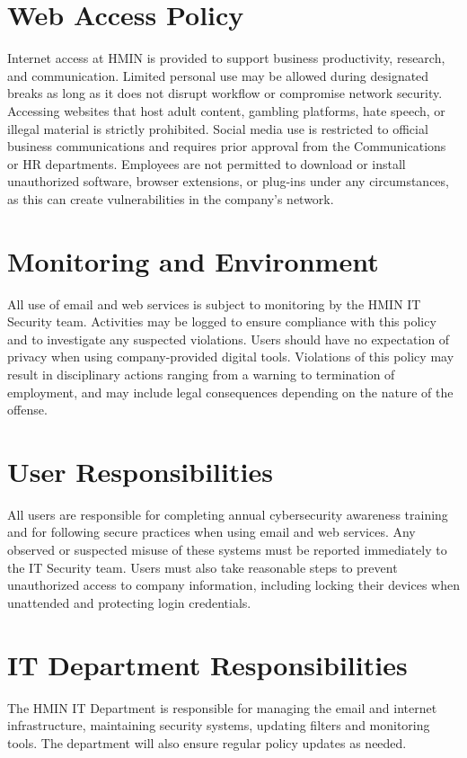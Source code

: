 \section{Web Access Policy}

Internet access at HMIN is provided to support business productivity, research, and communication. Limited personal use may be allowed during designated breaks as long as it does not disrupt workflow or compromise network security. Accessing websites that host adult content, gambling platforms, hate speech, or illegal material is strictly prohibited. Social media use is restricted to official business communications and requires prior approval from the Communications or HR departments. Employees are not permitted to download or install unauthorized software, browser extensions, or plug-ins under any circumstances, as this can create vulnerabilities in the company’s network.

\section{Monitoring and Environment}

All use of email and web services is subject to monitoring by the HMIN IT Security team. Activities may be logged to ensure compliance with this policy and to investigate any suspected violations. Users should have no expectation of privacy when using company-provided digital tools. Violations of this policy may result in disciplinary actions ranging from a warning to termination of employment, and may include legal consequences depending on the nature of the offense.

\section{User Responsibilities}

All users are responsible for completing annual cybersecurity awareness training and for following secure practices when using email and web services. Any observed or suspected misuse of these systems must be reported immediately to the IT Security team. Users must also take reasonable steps to prevent unauthorized access to company information, including locking their devices when unattended and protecting login credentials.

\section{IT Department Responsibilities}

The HMIN IT Department is responsible for managing the email and internet infrastructure, maintaining security systems, updating filters and monitoring tools. The department will also ensure regular policy updates as needed.